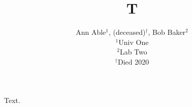 \documentclass{article}
\begin{document}
\title{T}
\author{Ann Able$^{1}$, (deceased)$^{\dagger}$, Bob Baker$^{2}$\\ $^1$Univ One\\ $^2$Lab Two\\ $^\dagger$Died 2020}
\maketitle
Text.
\end{document}
